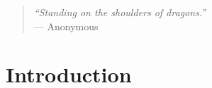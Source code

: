 
\begin{quote}
	\textit{``Standing on the shoulders of dragons.''} \\ --- Anonymous
\end{quote}

\section{Introduction}
\label{sec:introduction}




